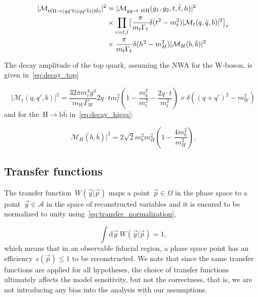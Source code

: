 \begin{align}
\label{eq:scattering_nwa}
|\mathcal{M}_{\mathrm{t} \bar{\mathrm{t}} \mathrm{H} \rightarrow (qq'b) (qq'\bar{b}) (b\bar{b})}|^2 &= |\mathcal{M}_{gg \rightarrow~\mathrm{t} \bar{\mathrm{t}} \mathrm{H}}(g_1, g_2, t, \bar{t}, h)|^2 \\
&\times \prod_{r = t,\bar{t}} \bigl[ \frac{\pi}{m_t \Gamma_t} \delta(t^2 - m_t^2) |\mathcal{M}_t(q,\bar{q},b)|^2 \bigr]_r \\
&\times \frac{\pi}{m_t \Gamma_t} \delta(h^2 - m_H^2) |\mathcal{M}_H(b,\bar{b})|^2
\end{align}

The decay amplitude of the top quark, assuming the NWA for the W-boson, is given in~\cref{eq:decay_top}

\begin{equation}
\label{eq:decay_top}
|\mathcal{M}_t(q,q',b)|^2 = \frac{32\pi m_t^4 g^4}{m_W \Gamma_W} {2 q\cdot t}{m_t^2} (1 - \frac{m_b^2}{m_t^2} - \frac{2 q \cdot t}{m_t^2}) \times \delta((q+q')^2 - m_W^2)
\end{equation}
and for the~$\mathrm{H} \rightarrow \mathrm{b}\bar{\mathrm{b}}$ in~\cref{eq:decay_higgs}:

\begin{equation}
\label{eq:decay_higgs}
\mathcal{M}_H(b,\bar{b})|^2 = 2\sqrt{2} m_b^2 m_H^2 (1 - \frac{4m_b^2}{m_H^2}).
\end{equation}

\subsection{Transfer functions}
\label{sec:transfer_functions}

The transfer function~$W(\vec{y} | \vec{p})$ maps a point~$\vec{p} \in \Omega$ in the phase space to a point~$\vec{y} \in \mathcal{A}$ in the space of reconstructed variables and it is ensured to be normalized to unity using~\cref{eq:transfer_normalization},

\begin{equation}
\label{eq:transfer_normalization}
\int \mathrm{d}\vec{y}~W(\vec{y} | \vec{p}) = 1,
\end{equation}
which means that in an observable fiducial region, a phase space point has an efficiency~$\epsilon(\vec{p}) \leq 1$ to be reconstructed. We note that since the same transfer functions are applied for all hypotheses, the choice of transfer functions ultimately affects the model sensitivity, but not the correctness, that is, we are not introducing any bias into the analysis with our assumptions.

